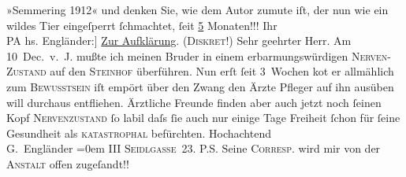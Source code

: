 \begin{ledgroupsized}[t]{13cm}
           \centering{}»Semmering 1912«\pend
           \pstart
           \noindent{}und denken Sie, wie dem Autor zumute iſt, der nun wie ein wildes Tier eingeſperrt
                  ſchmachtet, ſeit \uline{5} Monaten!!!\pend
           \pstart
           Ihr{\\}\spacefill\mbox{PA}\pend
           \pstart
           \noindent{}{\pb}{[}hs. Engländer:{]} \uline{Zur Aufklärung}. \textsc{(Diskret!)}\pend
           \pstart{}Sehr geehrter Herr.\pend\pstart
           Am 10 Dec. v. J. mußte ich meinen Bruder in einem erbarmungswürdigen \textsc{Nerven-Zustand} auf den \textsc{Steinhof} überführen.\pend
           \pstart
           Nun erſt ſeit 3 {\pb}Wochen ko{\geminationm}t er allmählich zum \textsc{Bewusstsein}{ }{\kaufmannsund} iſt empört über den Zwang den Ärzte{ }{\kaufmannsund} Pfleger auf ihn ausüben {\kaufmannsund}
               will durchaus entfliehen. Ärztliche {\pb}Freunde finden aber auch jetzt noch ſeinen Kopf {\kaufmannsund}{ }\textsc{Nervenzustand} ſo labil daſs ſie auch nur einige Tage
               Freiheit ſchon für ſeine Gesundheit als \textsc{katastrophal}
               befürchten.\pend
           \pstart
           Hochachtend{\\[\baselineskip]}\spacefill\mbox{G. Engländer}\pend
           \leftskip=0em{}\pstart
           \noindent{}III \textsc{Seidlgasse} 23.\pend
           \pstart
           P.S. Seine \textsc{Correſp}. wird mir von der \textsc{Anstalt} offen zugeſandt!!\pend
           
         
         \endnumbering{}\end{ledgroupsized}  \newcommand{\dateiname}{L02120}\newcommand{\titel}{Peter Altenberg und Georg Engländer an Arthur Schnitzler, [Mitte April] 1913}\newcommand{\editorInnen}{Martin Anton Müller und Gerd-Hermann Susen}
      